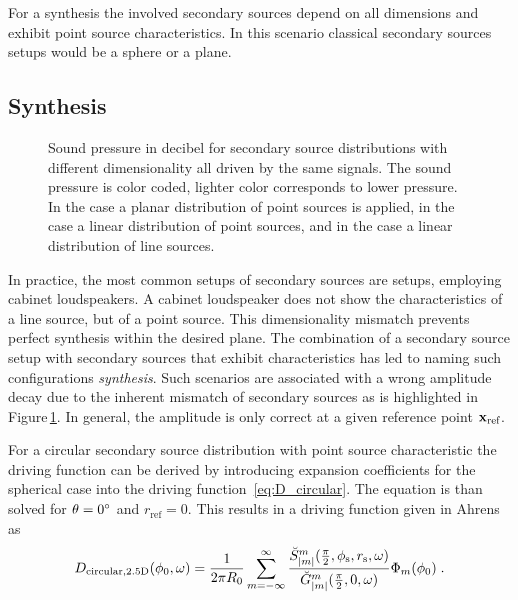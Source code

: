 For a \threeD synthesis the involved secondary sources depend on all dimensions
and exhibit point source characteristics. In this scenario
classical secondary sources setups would be a sphere or a plane.

\subsection{\twohalfD Synthesis}
\label{sec:25d_synthesis}
%
\begin{figure}
    \centering
    \small
    \caption{Sound pressure in decibel for secondary source distributions with different
    dimensionality all driven by the same signals. The sound pressure is color
    coded, lighter color corresponds to lower pressure.
    In the \threeD case a planar distribution of point sources is applied,
    in the \twohalfD case a linear distribution of point sources, and in the \twoD
    case a linear distribution of line sources.
    }
    \label{fig:sound_field_dimensionality}
\end{figure}
%
In practice, the most common setups of secondary sources are \twoD setups,
employing cabinet loudspeakers. A cabinet loudspeaker does not show the characteristics
of a line source, but of a point source. This dimensionality mismatch prevents perfect
synthesis within the desired plane. The combination of a \twoD secondary source
setup with secondary
sources that exhibit \threeD characteristics has led to naming such
configurations
\emph{\twohalfD synthesis}. Such scenarios
are associated with a wrong amplitude decay due to the inherent mismatch of secondary
sources as is highlighted in Figure\,\ref{fig:sound_field_dimensionality}.
In general, the amplitude is only correct at a given reference point
$\mathbf{x}_\text{ref}$.

For a circular secondary source distribution with point source characteristic
the \twohalfD driving function
can be derived by introducing expansion coefficients for the spherical case
into the driving function~\eqref{eq:D_circular}. The equation is than solved
for $\theta = 0^\circ$ and $r_\text{ref} = 0$. This
results in a \twohalfD driving function given in
Ahrens\autocite[][(3.49)]{Ahrens2012} as
%
\begin{equation}
    D_{\text{circular},\twohalfD}(\phi_0,\omega) = \frac{1}{2\pi R_0} \sum_{m=-\infty}^\infty
    \frac{\breve{S}_{|m|}^m (\frac{\pi}{2},\phi_\text{s},r_\text{s},\omega)}{\breve{G}_{|m|}^m
    (\frac{\pi}{2},0,\omega)}
    \Phi_m(\phi_0) \qp
    \label{eq:D_circular_25D}
\end{equation}
%

